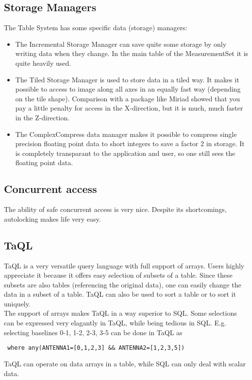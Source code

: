 \subsection{Storage Managers}
The Table System has some specific data (storage) managers:
\begin{itemize}
\item
 The Incremental Storage Manager can save quite some storage by only
 writing data when they change. In the main table of the MeasurementSet
 it is quite heavily used.
\item
 The Tiled Storage Manager is used to store data in a tiled way.
 It makes it possible to access to image along all axes in an equally
 fast way (depending on the tile shape). Comparison with a package
 like Miriad showed that you pay a little penalty for access in the
 X-direction, but it is much, much faster in the Z-direction.
\item
 The ComplexCompress data manager makes it possible to compress single
 precision floating point data to short integers to save a factor 2
 in storage. It is completely transparant to the application and user,
 so one still sees the floating point data.
\end{itemize}

\subsection{Concurrent access}
The ability of safe concurrent access is very nice. Despite its
shortcomings, autolocking makes life very easy.

\subsection{TaQL}
TaQL is a very versatile query language with full support of arrays.
Users highly appreciate it because it offers easy selection of subsets
of a table. Since these subsets are also tables (referencing the
original data), one can easily change the data in a subset of a table.
TaQL can also be used to sort a table or to sort it uniquely.
\\The support of arrays makes TaQL in a way superior to SQL. Some
selections can be expressed very elagantly in TaQL, while being
tedious in SQL. E.g. selecting baselines 0-1, 1-2, 2-3, 3-5 can be
done in TaQL as
\begin{verbatim}
 where any(ANTENNA1=[0,1,2,3] && ANTENNA2=[1,2,3,5])
\end{verbatim}
TaQL can operate on data arrays in a table, while SQL can only
deal with scalar data.


